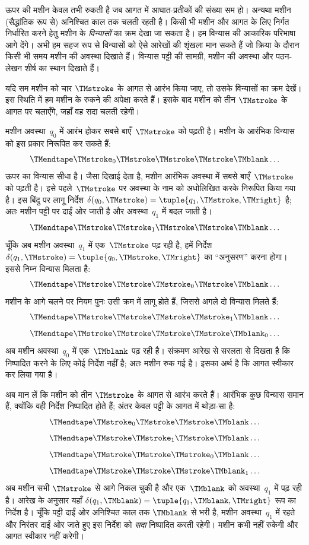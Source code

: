 \documentclass[../../../include/open-logic-section]{subfiles}
\begin{document}
\begin{explain}
ऊपर की मशीन केवल तभी रुकती है जब आगत में आघात-प्रतीकों की संख्या सम हो।
अन्यथा मशीन (सैद्धांतिक रूप से) अनिश्चित काल तक चलती रहती है। किसी भी
मशीन और आगत के लिए निर्गत निर्धारित करने हेतु मशीन के
\emph{विन्यासों} का क्रम देखा जा सकता है। हम विन्यास की आकारिक परिभाषा
आगे देंगे। अभी हम सहज रूप से विन्यासों को ऐसे आरेखों की शृंखला मान सकते
हैं जो क्रिया के दौरान किसी भी समय मशीन की अवस्था दिखाते हैं। विन्यास
पट्टी की सामग्री, मशीन की अवस्था और पठन-लेखन शीर्ष का स्थान दिखाते हैं।

यदि सम मशीन को चार $\TMstroke$ के आगत से आरंभ किया जाए, तो उसके विन्यासों
का क्रम देखें। इस स्थिति में हम मशीन के रुकने की अपेक्षा करते हैं। इसके
बाद मशीन को तीन $\TMstroke$ के आगत पर चलाएँगे, जहाँ वह सदा चलती रहेगी।

मशीन अवस्था~$q_0$ में आरंभ होकर सबसे बाएँ~$\TMstroke$ को पढ़ती है। मशीन
के आरंभिक विन्यास को इस प्रकार निरूपित कर सकते हैं:
\[
\TMendtape \TMstroke_0 \TMstroke \TMstroke \TMstroke \TMblank \ldots
\]
ऊपर का विन्यास सीधा है। जैसा दिखाई देता है, मशीन आरंभिक अवस्था में
सबसे बाएँ~$\TMstroke$ को पढ़ती है। इसे पहले~$\TMstroke$ पर अवस्था
के नाम को अधोलिखित करके निरूपित किया गया है। इस बिंदु पर लागू निर्देश
$\delta(q_0, \TMstroke) = \tuple{q_1, \TMstroke, \TMright}$ है; अतः
मशीन पट्टी पर दाईं ओर जाती है और अवस्था~$q_1$ में बदल जाती है।
\[
\TMendtape \TMstroke \TMstroke_1 \TMstroke \TMstroke \TMblank \ldots
\]
चूँकि अब मशीन अवस्था~$q_1$ में एक~$\TMstroke$ पढ़ रही है, हमें निर्देश
$\delta(q_1, \TMstroke) = \tuple{q_0,
  \TMstroke, \TMright}$ का
``अनुसरण'' करना होगा। इससे निम्न विन्यास मिलता है:
\[
\TMendtape \TMstroke \TMstroke \TMstroke_0 \TMstroke \TMblank \ldots
\]
मशीन के आगे चलने पर नियम पुनः उसी क्रम में लागू होते हैं, जिससे अगले दो
विन्यास मिलते हैं:
\[
\TMendtape \TMstroke \TMstroke \TMstroke \TMstroke_1 \TMblank \ldots
\]
\[
\TMendtape \TMstroke \TMstroke \TMstroke \TMstroke \TMblank_0 \ldots
\]
अब मशीन अवस्था~$q_0$ में एक~$\TMblank$ पढ़ रही है। संक्रमण आरेख से सरलता
से दिखता है कि निष्पादित करने के लिए कोई निर्देश नहीं है; अतः मशीन रुक
गई है। इसका अर्थ है कि आगत स्वीकार कर लिया गया है।

अब मान लें कि मशीन को तीन $\TMstroke$ के आगत से आरंभ करते हैं। आरंभिक
कुछ विन्यास समान हैं, क्योंकि वही निर्देश निष्पादित होते हैं; अंतर केवल
पट्टी के आगत में थोड़ा-सा है:
\[
\TMendtape \TMstroke_0 \TMstroke \TMstroke \TMblank \ldots
\]
\[
\TMendtape \TMstroke \TMstroke_1 \TMstroke \TMblank \ldots
\]
\[
\TMendtape \TMstroke \TMstroke \TMstroke_0 \TMblank \ldots
\]
\[
\TMendtape \TMstroke \TMstroke \TMstroke \TMblank_1 \ldots
\]
अब मशीन सभी $\TMstroke$ से आगे निकल चुकी है और एक~$\TMblank$ को
अवस्था~$q_1$ में पढ़ रही है। आरेख के अनुसार यहाँ
$\delta(q_1, \TMblank) =\tuple{q_1,
\TMblank, \TMright}$ रूप का निर्देश
है। चूँकि पट्टी दाईं ओर अनिश्चित काल तक $\TMblank$ से भरी है, मशीन
अवस्था~$q_1$ में रहते और निरंतर दाईं ओर जाते हुए इस निर्देश को
\emph{सदा} निष्पादित करती रहेगी। मशीन कभी नहीं रुकेगी और आगत स्वीकार
नहीं करेगी।
\end{explain}
\end{document}
